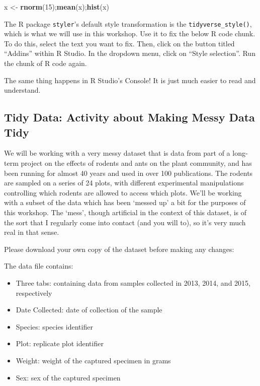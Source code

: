 \documentclass[
]{book}
\newenvironment{Shaded}{\begin{snugshade}}{\end{snugshade}}
\newcommand{\DecValTok}[1]{\textcolor[rgb]{0.00,0.00,0.81}{#1}}
\newcommand{\FunctionTok}[1]{\textcolor[rgb]{0.13,0.29,0.53}{\textbf{#1}}}
\newcommand{\NormalTok}[1]{#1}
\newcommand{\OtherTok}[1]{\textcolor[rgb]{0.56,0.35,0.01}{#1}}
\providecommand{\tightlist}{%
  \setlength{\itemsep}{0pt}\setlength{\parskip}{0pt}}
\begin{document}
\begin{Shaded}
\begin{Highlighting}[]
\NormalTok{x }\OtherTok{\textless{}{-}} \FunctionTok{rnorm}\NormalTok{(}\DecValTok{15}\NormalTok{);}\FunctionTok{mean}\NormalTok{(x);}\FunctionTok{hist}\NormalTok{(x)}
\end{Highlighting}
\end{Shaded}

The R package \texttt{styler}'s default style transformation is the \texttt{tidyverse\_style()}, which is what we will use in this workshop. Use it to fix the below R code chunk. To do this, select the text you want to fix. Then, click on the button titled ``Addins'' within R Studio. In the dropdown menu, click on ``Style selection''. Run the chunk of R code again.

The same thing happens in R Studio's Console! It is just much easier to read and understand.

\subsection{Tidy Data: Activity about Making Messy Data Tidy}\label{tidy-data-activity-about-making-messy-data-tidy}

We will be working with a very messy dataset that is data from part of a long-term project on the effects of rodents and ants on the plant community, and has been running for almost 40 years and used in over 100 publications. The rodents are sampled on a series of 24 plots, with different experimental manipulations controlling which rodents are allowed to access which plots. We'll be working with a subset of the data which has been `messed up' a bit for the purposes of this workshop. The `mess', though artificial in the context of this dataset, is of the sort that I regularly come into contact (and you will to), so it's very much real in that sense.

Please download your own copy of the dataset before making any changes:

The data file contains:

\begin{itemize}
\tightlist
\item
  Three tabs: containing data from samples collected in 2013, 2014, and 2015, respectively
\item
  Date Collected: date of collection of the sample
\item
  Species: species identifier
\item
  Plot: replicate plot identifier
\item
  Weight: weight of the captured specimen in grams
\item
  Sex: sex of the captured specimen
\end{itemize}
\end{document}
